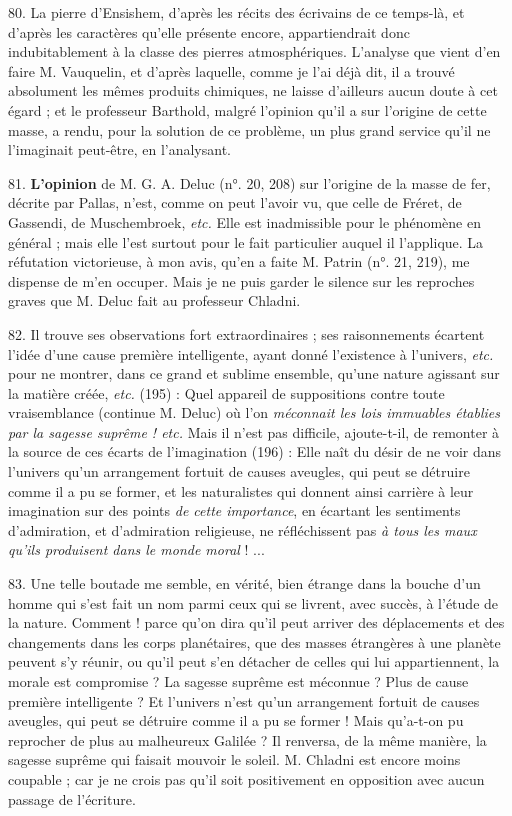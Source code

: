 \documentclass[a4paper, 11pt, oneside, polutonikogreek, french]{article}
\begin{document}
80. La pierre d'Ensishem, d'après les récits des écrivains de ce temps-là, et d'après les caractères qu'elle présente encore, appartiendrait donc indubitablement à la classe des pierres atmosphériques. L'analyse que vient d'en faire M. Vauquelin, et d'après laquelle, comme je l'ai déjà dit, il a trouvé absolument les mêmes produits chimiques, ne laisse d'ailleurs aucun doute à cet égard ; et le professeur Barthold, malgré l'opinion qu'il a sur l'origine de cette masse, a rendu, pour la solution de ce problème, un plus grand service qu'il ne l'imaginait peut-être, en l'analysant.

81. \textbf{L'opinion} de M. G. A. Deluc (n°. 20, 208) sur l'origine de la masse de fer, décrite par Pallas, n'est, comme on peut l'avoir vu, que celle de Fréret, de Gassendi, de Muschembroek, \emph{etc.} Elle est inadmissible pour le phénomène en général ; mais elle l'est surtout pour le fait particulier auquel il l'applique. La réfutation victorieuse, à mon avis, qu'en a faite M. Patrin (n°. 21, 219), me dispense de m'en occuper. Mais je ne puis garder le silence sur les reproches graves que M. Deluc fait au professeur Chladni.

82. Il trouve ses observations fort extraordinaires ; ses raisonnements écartent l'idée d'une cause première intelligente, ayant donné l'existence à l'univers, \emph{etc.} pour ne montrer, dans ce grand et sublime ensemble, qu'une nature agissant sur la matière créée, \emph{etc.} (195) : \og Quel appareil de suppositions contre toute vraisemblance (continue M. Deluc) où l'on \emph{méconnait les lois immuables établies par la sagesse suprême ! etc.} \fg Mais il n'est pas difficile, ajoute-t-il, de remonter à la source de ces écarts de l'imagination (196) : \og Elle naît du désir de ne voir dans l'univers qu'un arrangement fortuit de causes aveugles, qui peut se détruire comme il a pu se former, et les naturalistes qui donnent ainsi carrière à leur imagination sur des points \emph{de cette importance}, en écartant les sentiments d'admiration, et d'admiration religieuse, ne réfléchissent pas \emph{à tous les maux qu'ils produisent dans le monde moral} ! ... \fg

83. Une telle boutade me semble, en vérité, bien étrange dans la bouche d'un homme qui s'est fait un nom parmi ceux qui se livrent, avec succès, à l'étude de la nature. Comment ! parce qu'on dira qu'il peut arriver des déplacements et des changements dans les corps planétaires, que des masses étrangères à une planète peuvent s'y réunir, ou qu'il peut s'en détacher de celles qui lui appartiennent, la morale est compromise ? La sagesse suprême est méconnue ? Plus de cause première intelligente ? Et l'univers n'est qu'un arrangement fortuit de causes aveugles, qui peut se détruire comme il a pu se former ! Mais qu'a-t-on pu reprocher de plus au malheureux Galilée ? Il renversa, de la même manière, la sagesse suprême qui faisait mouvoir le soleil. M. Chladni est encore moins coupable ; car je ne crois pas qu'il soit positivement en opposition avec aucun passage de l'écriture.
\end{document}
